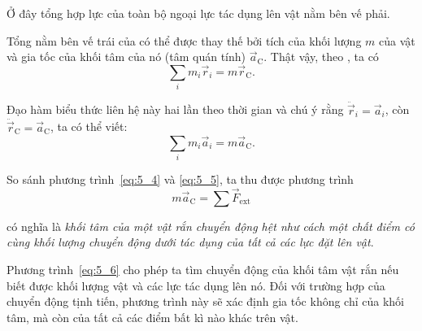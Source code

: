 \noindent
Ở đây tổng hợp lực của toàn bộ ngoại lực tác dụng lên vật nằm bên vế phải.

Tổng nằm bên vế trái của  có thể được thay thế bởi tích của khối lượng $m$ của vật và gia tốc của khối tâm của nó (tâm quán tính) $\vec{a}_{\text{C}}$. Thật vậy, theo , ta có
\begin{equation*}
	\sum_i m_i\vec{r}_i = m \vec{r}_{\text{C}}.
\end{equation*}

\noindent
Đạo hàm biểu thức liên hệ này hai lần theo thời gian và chú ý rằng $\ddot{\vec{r}}_i=\vec{a}_i$, còn $\ddot{\vec{r}}_{\text{C}}=\vec{a}_{\text{C}}$, ta có thể viết:
\begin{equation}\label{eq:5_5}
	\sum_i m_i\vec{a}_i = m \vec{a}_{\text{C}}.
\end{equation}

So sánh phương trình~\eqref{eq:5_4} và \eqref{eq:5_5}, ta thu được phương trình
\begin{equation}\label{eq:5_6}
	m \vec{a}_{\text{C}} = \sum\vec{F}_{\text{ext}}
\end{equation}

\noindent
có nghĩa là \textit{khối tâm của một vật rắn chuyển động hệt như cách một chất điểm có cùng khối lượng chuyển động dưới tác dụng của tất cả các lực đặt lên vật}.

Phương trình~\eqref{eq:5_6} cho phép ta tìm chuyển động của khối tâm vật rắn nếu biết được khối lượng vật và các lực tác dụng lên nó. Đối với trường hợp của chuyển động tịnh tiến, phương trình này sẽ xác định gia tốc không chỉ của khối tâm, mà còn của tất cả các điểm bất kì nào khác trên vật.

